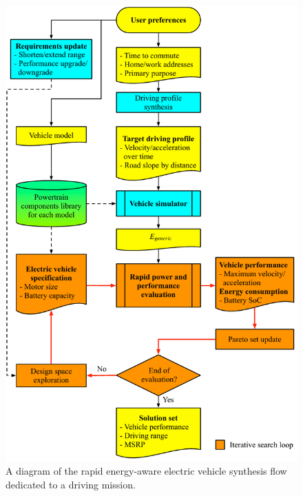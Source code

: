 \documentclass[journal]{IEEEtran}
\begin{document}
\begin{figure}
\centering
\includegraphics[width=1.0\hsize]{Figures/Framework_proposed.pdf}
\caption{A diagram of the rapid energy-aware electric vehicle synthesis flow dedicated to a driving mission.}
\label{fig:framework_proposed}
\end{figure}    
\end{document}
